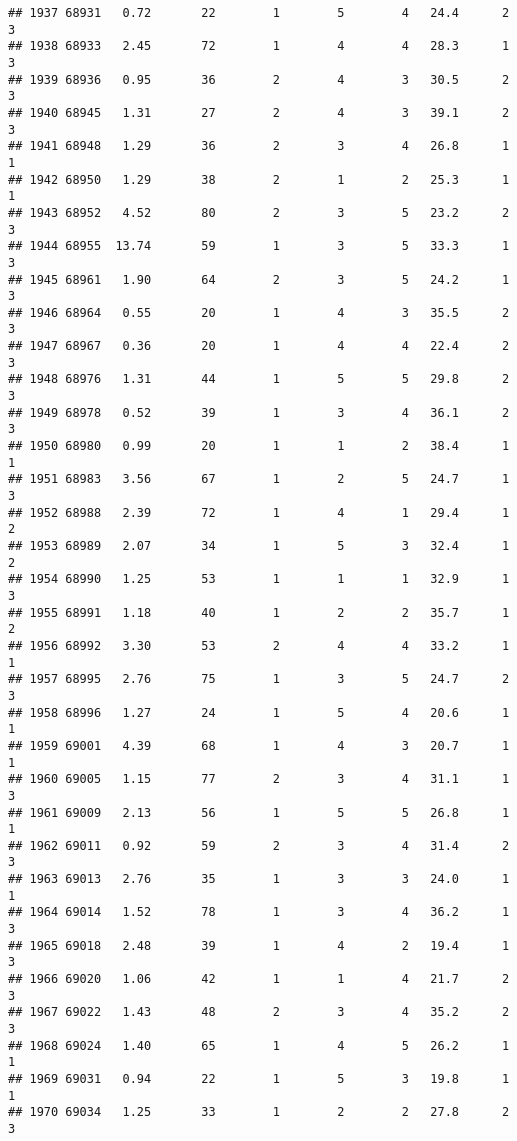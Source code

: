 \documentclass[
]{article}
\begin{document}
\begin{verbatim}
## 1937 68931   0.72       22        1        5        4   24.4      2      3
## 1938 68933   2.45       72        1        4        4   28.3      1      3
## 1939 68936   0.95       36        2        4        3   30.5      2      3
## 1940 68945   1.31       27        2        4        3   39.1      2      3
## 1941 68948   1.29       36        2        3        4   26.8      1      1
## 1942 68950   1.29       38        2        1        2   25.3      1      1
## 1943 68952   4.52       80        2        3        5   23.2      2      3
## 1944 68955  13.74       59        1        3        5   33.3      1      3
## 1945 68961   1.90       64        2        3        5   24.2      1      3
## 1946 68964   0.55       20        1        4        3   35.5      2      3
## 1947 68967   0.36       20        1        4        4   22.4      2      3
## 1948 68976   1.31       44        1        5        5   29.8      2      3
## 1949 68978   0.52       39        1        3        4   36.1      2      3
## 1950 68980   0.99       20        1        1        2   38.4      1      1
## 1951 68983   3.56       67        1        2        5   24.7      1      3
## 1952 68988   2.39       72        1        4        1   29.4      1      2
## 1953 68989   2.07       34        1        5        3   32.4      1      2
## 1954 68990   1.25       53        1        1        1   32.9      1      3
## 1955 68991   1.18       40        1        2        2   35.7      1      2
## 1956 68992   3.30       53        2        4        4   33.2      1      1
## 1957 68995   2.76       75        1        3        5   24.7      2      3
## 1958 68996   1.27       24        1        5        4   20.6      1      1
## 1959 69001   4.39       68        1        4        3   20.7      1      1
## 1960 69005   1.15       77        2        3        4   31.1      1      3
## 1961 69009   2.13       56        1        5        5   26.8      1      1
## 1962 69011   0.92       59        2        3        4   31.4      2      3
## 1963 69013   2.76       35        1        3        3   24.0      1      1
## 1964 69014   1.52       78        1        3        4   36.2      1      3
## 1965 69018   2.48       39        1        4        2   19.4      1      3
## 1966 69020   1.06       42        1        1        4   21.7      2      3
## 1967 69022   1.43       48        2        3        4   35.2      2      3
## 1968 69024   1.40       65        1        4        5   26.2      1      1
## 1969 69031   0.94       22        1        5        3   19.8      1      1
## 1970 69034   1.25       33        1        2        2   27.8      2      3

\end{verbatim}
\end{document}
